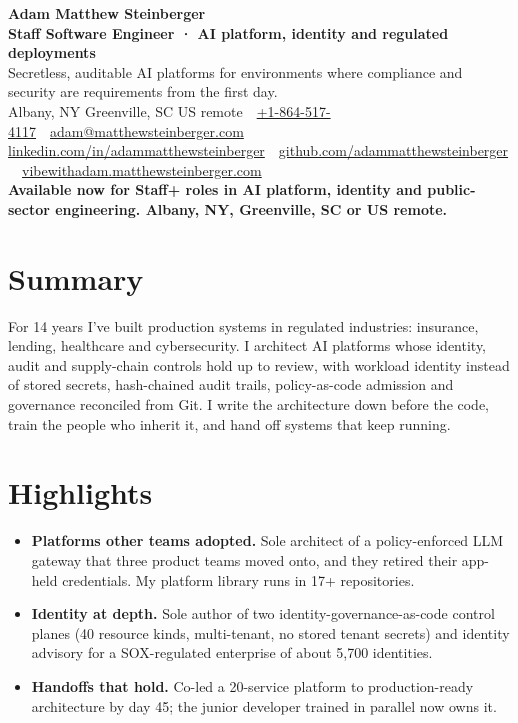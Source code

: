 \documentclass[10pt,letterpaper]{article}
\newcommand{\szname}{\fontsize{20pt}{24pt}\selectfont}
\newcommand{\sztitle}{\fontsize{10.5pt}{13pt}\selectfont}
\newcommand{\szbody}{\fontsize{9pt}{10.8pt}\selectfont}
\newcommand{\szmeta}{\fontsize{8pt}{10pt}\selectfont}
\begin{document}
\color{ink}\szbody

\begin{center}
{\szname\bfseries\color{primary} Adam Matthew Steinberger}\\[3pt]
{\sztitle\bfseries\color{accent} Staff Software Engineer · AI platform, identity and regulated deployments}\\[4pt]
{\szbody Secretless, auditable AI platforms for environments where compliance and security are requirements from the first day.}\\[6pt]
{\szmeta\color{muted} Albany, NY \textbullet{} Greenville, SC \textbullet{} US remote\ {\color{rulecolor}\textbar}\ \href{tel:+18645174117}{+1-864-517-4117}\ {\color{rulecolor}\textbar}\ \href{mailto:adam@matthewsteinberger.com}{adam@matthewsteinberger.com}}\\[2pt]
{\szmeta\color{muted} \href{https://www.linkedin.com/in/adammatthewsteinberger/}{linkedin.com/in/adammatthewsteinberger}\ {\color{rulecolor}\textbar}\ \href{https://github.com/adammatthewsteinberger}{github.com/adammatthewsteinberger}\ {\color{rulecolor}\textbar}\ \href{https://vibewithadam.matthewsteinberger.com}{vibewithadam.matthewsteinberger.com}}\\[6pt]
{\szbody\bfseries Available now for Staff+ roles in AI platform, identity and public-sector engineering. Albany, NY, Greenville, SC or US remote.}
\end{center}
\vspace{-6pt}
\section*{Summary}
For 14 years I've built production systems in regulated industries: insurance, lending, healthcare and cybersecurity. I architect AI platforms whose identity, audit and supply-chain controls hold up to review, with workload identity instead of stored secrets, hash-chained audit trails, policy-as-code admission and governance reconciled from Git. I write the architecture down before the code, train the people who inherit it, and hand off systems that keep running.\par
\section*{Highlights}
\begin{itemize}
\item \textbf{Platforms other teams adopted.} Sole architect of a policy-enforced LLM gateway that three product teams moved onto, and they retired their app-held credentials. My platform library runs in 17+ repositories.
\item \textbf{Identity at depth.} Sole author of two identity-governance-as-code control planes (40 resource kinds, multi-tenant, no stored tenant secrets) and identity advisory for a SOX-regulated enterprise of about 5,700 identities.
\item \textbf{Handoffs that hold.} Co-led a 20-service platform to production-ready architecture by day 45; the junior developer trained in parallel now owns it.
\end{itemize}
\end{document}
